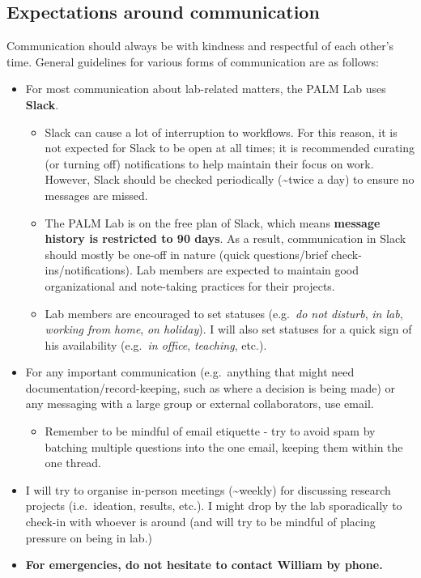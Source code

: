 \documentclass[
]{book}
\providecommand{\tightlist}{%
  \setlength{\itemsep}{0pt}\setlength{\parskip}{0pt}}
\begin{document}
\hypertarget{expectations-around-communication}{%
\subsection{Expectations around communication}\label{expectations-around-communication}}

Communication should always be with kindness and respectful of each other's time. General guidelines for various forms of communication are as follows:

\begin{itemize}
\tightlist
\item
  For most communication about lab-related matters, the PALM Lab uses \textbf{Slack}.

  \begin{itemize}
  \tightlist
  \item
    Slack can cause a lot of interruption to workflows. For this reason, it is not expected for Slack to be open at all times; it is recommended curating (or turning off) notifications to help maintain their focus on work. However, Slack should be checked periodically (\textasciitilde twice a day) to ensure no messages are missed.
  \item
    The PALM Lab is on the free plan of Slack, which means \textbf{message history is restricted to 90 days}. As a result, communication in Slack should mostly be one-off in nature (quick questions/brief check-ins/notifications). Lab members are expected to maintain good organizational and note-taking practices for their projects.
  \item
    Lab members are encouraged to set statuses (e.g.~\emph{do not disturb}, \emph{in lab}, \emph{working from home}, \emph{on holiday}). I will also set statuses for a quick sign of his availability (e.g.~\emph{in office}, \emph{teaching}, etc.).
  \end{itemize}
\item
  For any important communication (e.g.~anything that might need documentation/record-keeping, such as where a decision is being made) or any messaging with a large group or external collaborators, use email.

  \begin{itemize}
  \tightlist
  \item
    Remember to be mindful of email etiquette - try to avoid spam by batching multiple questions into the one email, keeping them within the one thread.
  \end{itemize}
\item
  I will try to organise in-person meetings (\textasciitilde weekly) for discussing research projects (i.e.~ideation, results, etc.). I might drop by the lab sporadically to check-in with whoever is around (and will try to be mindful of placing pressure on being in lab.)
\item
  \textbf{For emergencies, do not hesitate to contact William by phone.}
\end{itemize}
\end{document}
